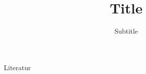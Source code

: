 \documentclass{preamble}
\title{Title}
\subtitle{Subtitle}
\begin{document}
\nocite{*}

\maketitle

\begin{frame}[allowframebreaks]{Literatur}
    \printbibliography
\end{frame}
\end{document}
